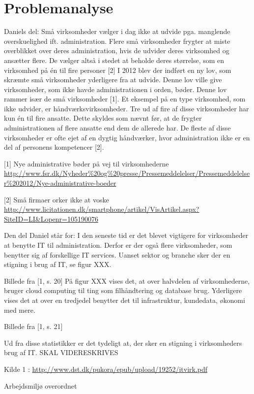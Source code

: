 \documentclass[11pt, twoside, a4paper, openright]{report}
\begin{document}
\chapter{Problemanalyse}
Daniels del:
Små virksomheder vælger i dag ikke at udvide pga. manglende overskuelighed ift. administration. Flere små virksomheder frygter at miste overblikket over deres administration, hvis de udvider deres virksomhed og ansætter flere. De vælger altså i stedet at beholde deres størrelse, som en virksomhed på én til fire personer [2]
I 2012 blev der indført en ny lov, som skræmte små virksomheder yderligere fra at udvide. Denne lov ville give virksomheder, som ikke havde administrationen i orden, bøder. Denne lov rammer især de små virksomheder [1].
Et eksempel på en type virksomhed, som ikke udvider, er håndværksvirksomheder. Tre ud af fire af disse virksomheder har kun én til fire ansatte. Dette skyldes som nævnt før, at de frygter administrationen af flere ansatte end dem de allerede har. De fleste af disse virksomheder er ofte ejet af en dygtig håndværker, hvor administration ikke er en del af personens kompetencer [2].

[1] Nye administrative bøder på vej til virksomhederne
\url {http://www.fsr.dk/Nyheder%20og%20presse/Pressemeddelelser/Pressemeddelelser%202012/Nye-administrative-boeder}

[2] Små firmaer orker ikke at voske
\url {http://www.licitationen.dk/smartphone/artikel/VisArtikel.aspx?SiteID=LI&Lopenr=105190076}

Den del Daniel står for:
I den seneste tid er det blevet vigtigere for virksomheder at benytte IT til administration. Derfor er der også flere virksomheder, som benytter sig af forskellige IT services. Uanset sektor og branche sker der en stigning i brug af IT, se figur XXX.

Billede fra [1, s. 20]
På figur XXX vises det, at over halvdelen af virksomhederne, bruger cloud computing til ting som filhåndtering og database brug. Yderligere vises det at over en tredjedel benytter det til infrastruktur, kundedata, økonomi med mere. 

Billede fra [1, s. 21]

Ud fra disse statistikker er det tydeligt at, der sker en stigning  i virksomheders brug af IT. SKAL VIDERESKRIVES

Kilde 1 : \url{http://www.dst.dk/pukora/epub/upload/19252/itvirk.pdf}

\newpage

Arbejdsmiljø overordnet
\end{document}
